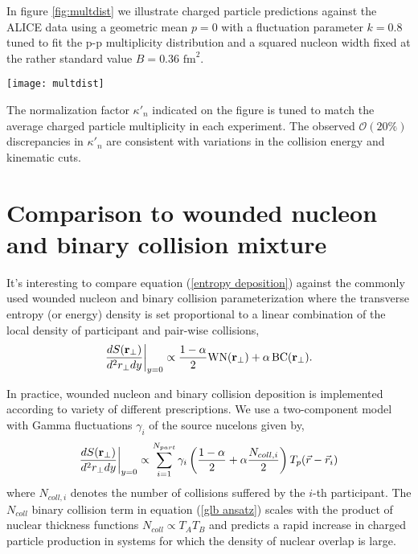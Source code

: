 \documentclass[aps,prl,reprint,amsmath,nofootinbib]{revtex4-1}
\begin{document}
In figure \ref{fig:multdist} we illustrate charged particle predictions against the ALICE data using a geometric mean $p=0$ with a fluctuation parameter $k=0.8$ tuned 
to fit the p-p multiplicity distribution and a squared nucleon width fixed at the rather standard value $B=0.36$ $\mbox{fm}^2$. 

\begin{figure*}
    \texttt{[image: multdist]}
    \caption{\label{fig:multdist} Minimum bias pp, pPb and PbPb charged particle distributions for power $p=0$, fluctuation parameter $k=0.8$, squared nucleon width 
    $B=0.36~fm^2$ and normalization factor $\kappa'_n$ indicated in the legend.}
\end{figure*}

The normalization factor $\kappa'_n$ indicated on the figure is tuned to match the average charged particle multiplicity in each experiment. The observed
$\mathcal{O}(20\%)$ discrepancies in $\kappa'_n$ are consistent with variations in the collision energy and kinematic cuts.

\section{Comparison to wounded nucleon and binary collision mixture}

It's interesting to compare equation (\ref{entropy deposition}) against the commonly used wounded nucleon and binary collision parameterization where the 
transverse entropy (or energy) density is set proportional to a linear combination of the local density of participant and pair-wise collisions,
\begin{equation}
 \label{glb ansatz}
 \frac{dS({\bf r}_\perp)}{d^2r_\perp dy} \biggr \rvert_{y=0}  \propto \frac{1-\alpha}{2}\mbox{WN}({\bf r_\perp}) + \alpha\, \mbox{BC}({\bf r_\perp}). 
\end{equation}

In practice, wounded nucleon and binary collision deposition is implemented according to variety of different prescriptions. We use a two-component model
with Gamma fluctuations $\gamma_i$ of the source nucelons given by,
\begin{equation}
 \label{glb algorithm}
 \frac{dS({\bf r}_\perp)}{d^2r_\perp dy} \biggr \rvert_{y=0}  \propto \sum\limits_{i=1}^{N_{part}} \gamma_i \left(\frac{1-\alpha}{2} + \alpha \frac{N_{coll,i}}{2} \right ) T_p(\vec{r}-\vec{r}_i)
\end{equation}
where $N_{coll,i}$ denotes the number of collisions suffered by the $i$-th participant. The $N_{coll}$ binary collision term in equation (\ref{glb ansatz}) scales with the product of nuclear thickness 
functions $N_{coll} \propto T_A T_B$ and predicts a rapid increase in charged particle production in systems for which the density of nuclear overlap is large.  
\end{document}
